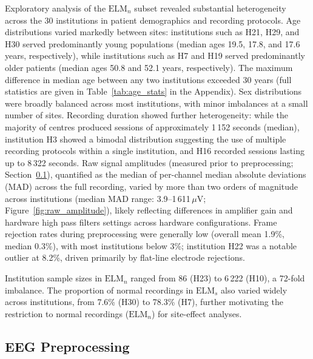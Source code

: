 \documentclass[preprint,12pt]{elsarticle}
\begin{document}
Exploratory analysis of the $\mathrm{ELM}_n$ subset revealed
substantial heterogeneity across the 30 institutions in patient
demographics and recording protocols.
Age distributions varied markedly between sites: institutions such as
H21, H29, and H30 served predominantly young populations (median
ages 19.5, 17.8, and 17.6 years, respectively), while institutions
such as H7 and H19 served predominantly older patients (median ages
50.8 and 52.1 years, respectively).
The maximum difference in median age between any two institutions
exceeded 30 years (full statistics are given in
Table~\ref{tab:age_stats} in the Appendix).
Sex distributions were broadly balanced across most institutions,
with minor imbalances at a small number of sites.
Recording duration showed further heterogeneity: while the majority
of centres produced sessions of approximately 1\,152 seconds
(median), institution H3 showed a bimodal distribution suggesting the
use of multiple recording protocols within a single institution, and
H16 recorded sessions lasting up to 8\,322 seconds.
Raw signal amplitudes (measured prior to preprocessing;
Section~\ref{subsec:preprocessing}), quantified as the median of per-channel median
absolute deviations (MAD) across the full recording, varied by more
than two orders of magnitude across institutions (median MAD range:
3.9--1\,611\,$\mu$V; Figure~\ref{fig:raw_amplitude}), likely
reflecting differences in amplifier gain and hardware high pass filters settings across hardware
configurations.
Frame rejection rates during preprocessing were generally low
(overall mean 1.9\%, median 0.3\%), with most institutions below
3\%; institution H22 was a notable outlier at 8.2\%, driven
primarily by flat-line electrode rejections.



Institution sample sizes in $\mathrm{ELM}_n$ ranged from 86 (H23)
to 6\,222 (H10), a 72-fold imbalance.
The proportion of normal recordings in $\mathrm{ELM}_s$ also varied
widely across institutions, from 7.6\% (H30) to 78.3\% (H7), further
motivating the restriction to normal recordings ($\mathrm{ELM}_n$)
for site-effect analyses.



\subsection{EEG Preprocessing}
\label{subsec:preprocessing}
\end{document}
